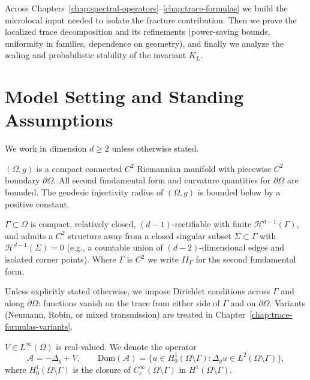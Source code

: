 Across Chapters~\ref{chap:spectral-operators}–\ref{chap:trace-formulas} we build
the microlocal input needed to isolate the fracture contribution. Then we prove
the localized trace decomposition and its refinements (power-saving bounds,
uniformity in families, dependence on geometry), and finally we analyze the
scaling and probabilistic stability of the invariant $K_L$.

\section{Model Setting and Standing Assumptions}
\label{sec:intro-assumptions}

We work in dimension $d\ge 2$ unless otherwise stated.

\begin{assumption}
\label{ass:ambient}
$(\Omega,g)$ is a compact connected $C^{2}$ Riemannian manifold with piecewise
$C^{2}$ boundary $\partial\Omega$. All second fundamental form and curvature
quantities for $\partial\Omega$ are bounded. The geodesic injectivity radius of
$(\Omega,g)$ is bounded below by a positive constant.
\end{assumption}

\begin{assumption}
\label{ass:fracture}
$\Gamma\subset\Omega$ is compact, relatively closed, $(d-1)$-rectifiable with
finite $\mathcal{H}^{d-1}(\Gamma)$, and admits a $C^{2}$ structure away from a
closed singular subset $\Sigma\subset\Gamma$ with $\mathcal{H}^{d-1}(\Sigma)=0$
(e.g., a countable union of $(d-2)$-dimensional edges and isolated corner points).
Where $\Gamma$ is $C^{2}$ we write $II_\Gamma$ for the second fundamental form.
\end{assumption}

\begin{assumption}
\label{ass:bc}
Unless explicitly stated otherwise, we impose Dirichlet conditions across
$\Gamma$ and along $\partial\Omega$: functions vanish on the trace from either
side of $\Gamma$ and on $\partial\Omega$. Variants (Neumann, Robin, or mixed
transmission) are treated in Chapter~\ref{chap:trace-formulas-variants}.
\end{assumption}

\begin{assumption}[Potential]
\label{ass:potential}
$V\in L^\infty(\Omega)$ is real-valued. We denote the operator
\[
\mathcal{A} = -\Delta_g + V,\qquad
\mathrm{Dom}(\mathcal{A}) = \bigl\{u\in H^1_0(\Omega\setminus\Gamma): \Delta_g u\in L^2(\Omega\setminus\Gamma)\bigr\},
\]
where $H^1_0(\Omega\setminus\Gamma)$ is the closure of $C^\infty_c(\Omega\setminus\Gamma)$
in $H^1(\Omega\setminus\Gamma)$.
\end{assumption}

